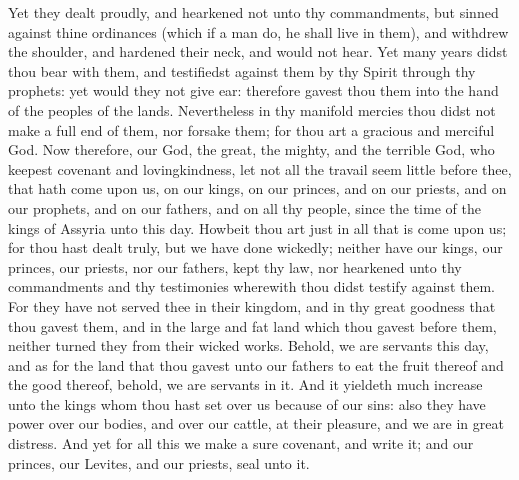 Yet they dealt proudly, and hearkened not unto thy commandments, but sinned against thine ordinances (which if a man do, he shall live in them), and withdrew the shoulder, and hardened their neck, and would not hear. Yet many years didst thou bear with them, and testifiedst against them by thy Spirit through thy prophets: yet would they not give ear: therefore gavest thou them into the hand of the peoples of the lands. Nevertheless in thy manifold mercies thou didst not make a full end of them, nor forsake them; for thou art a gracious and merciful God.  Now therefore, our God, the great, the mighty, and the terrible God, who keepest covenant and lovingkindness, let not all the travail seem little before thee, that hath come upon us, on our kings, on our princes, and on our priests, and on our prophets, and on our fathers, and on all thy people, since the time of the kings of Assyria unto this day. Howbeit thou art just in all that is come upon us; for thou hast dealt truly, but we have done wickedly; neither have our kings, our princes, our priests, nor our fathers, kept thy law, nor hearkened unto thy commandments and thy testimonies wherewith thou didst testify against them. For they have not served thee in their kingdom, and in thy great goodness that thou gavest them, and in the large and fat land which thou gavest before them, neither turned they from their wicked works. Behold, we are servants this day, and as for the land that thou gavest unto our fathers to eat the fruit thereof and the good thereof, behold, we are servants in it. And it yieldeth much increase unto the kings whom thou hast set over us because of our sins: also they have power over our bodies, and over our cattle, at their pleasure, and we are in great distress. And yet for all this we make a sure covenant, and write it; and our princes, our Levites, and our priests, seal unto it. 

